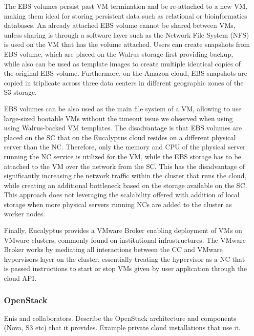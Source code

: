 \documentclass[10pt]{bmc_article}
\newenvironment{bmcformat}{\baselineskip20pt\sloppy\setboolean{publ}{false}}{\baselineskip20pt\sloppy}
\begin{document}
\begin{bmcformat}
The EBS volumes persist past VM termination and be re-attached to a new VM,  making them ideal for storing persistent data such as relational or 
bioinformatics databases. An already attached EBS volume cannot be shared between VMs, unless sharing is through a software layer such as the 
Network File System (NFS) is used on the VM that has the volume attached. Users can create snapshots from EBS volume, which are placed on the Walrus 
storage first providing backup, while also can be used as template images to create multiple identical copies of the original EBS volume. Furthermore, on 
the Amazon cloud, EBS snapshots are copied in triplicate across three data centers in different geographic zones of the S3 storage.  

EBS volumes can be also used as the main file system of a VM, allowing to use large-sized bootable VMs without the timeout issue we observed when using
using Walrus-backed VM templates. The disadvantage is that EBS volumes are placed on the SC that on the Eucalyptus cloud resides on a different physical
server than the  NC. Therefore, only the memory and CPU of the physical server running the NC service is utilized for the VM, while the EBS storage has to 
be attached to the VM over the network from the SC. This has the disadvantage of significantly increasing the network traffic within the cluster that runs the 
cloud, while creating an additional bottleneck based on the storage available on the SC. This approach does not leveraging the scalability offered with addition
of local storage when more physical servers running NCs are added to the cluster as worker nodes.

Finally, Eucalyptus provides a VMware Broker enabling deployment of VMs on VMware clusters, commonly found on institutional
infrastructures. The  VMware Broker works by mediating all interactions between the CC and VMware hypervisors layer on the cluster, essentially
treating the hypervisor as a NC that is passed instructions to start or stop VMs given by user application through the cloud API. \pb


\subsubsection*{OpenStack}
Enis and collaborators. Describe the OpenStack architecture and components (Nova, S3 etc) that it provides.
Example private cloud installations that use it. \pb




\end{bmcformat}
\end{document}
